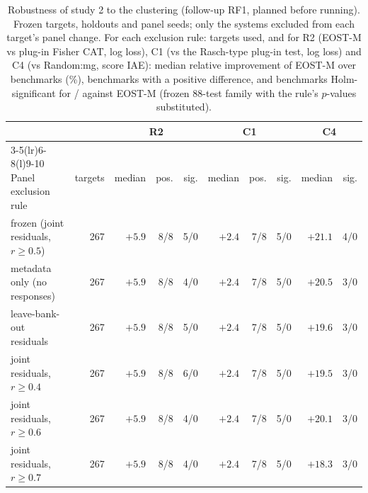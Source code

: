 \begin{table}[tbp]
\centering\footnotesize
\caption{Robustness of study 2 to the clustering (follow-up RF1, planned before running). Frozen targets, holdouts and panel seeds; only the systems excluded from each target's panel change. For each exclusion rule: targets used, and for R2 (EOST-M vs plug-in Fisher CAT, log loss), C1 (vs the Rasch-type plug-in test, log loss) and C4 (vs Random:mg, score IAE): median relative improvement of EOST-M over benchmarks (\%), benchmarks with a positive difference, and benchmarks Holm-significant for / against EOST-M (frozen 88-test family with the rule's $p$-values substituted).}
\label{tab:robclust}
\setlength{\tabcolsep}{2.5pt}
\begin{tabular}{@{}lrrrrrrrrr@{}}
\toprule
 & & \multicolumn{3}{c}{R2} & \multicolumn{3}{c}{C1} & \multicolumn{2}{c}{C4} \\
\cmidrule(lr){3-5}\cmidrule(lr){6-8}\cmidrule(l){9-10}
Panel exclusion rule & targets & median & pos. & sig. & median & pos. & sig. & median & sig. \\
\midrule
frozen (joint residuals, $r\ge0.5$) & 267 & $+5.9$ & 8/8 & 5/0 & $+2.4$ & 7/8 & 5/0 & $+21.1$ & 4/0 \\
\midrule
metadata only (no responses) & 267 & $+5.9$ & 8/8 & 4/0 & $+2.4$ & 7/8 & 5/0 & $+20.5$ & 3/0 \\
leave-bank-out residuals & 267 & $+5.9$ & 8/8 & 5/0 & $+2.4$ & 7/8 & 5/0 & $+19.6$ & 3/0 \\
joint residuals, $r\ge0.4$ & 267 & $+5.9$ & 8/8 & 6/0 & $+2.4$ & 7/8 & 5/0 & $+19.5$ & 3/0 \\
joint residuals, $r\ge0.6$ & 267 & $+5.9$ & 8/8 & 4/0 & $+2.4$ & 7/8 & 5/0 & $+20.1$ & 3/0 \\
joint residuals, $r\ge0.7$ & 267 & $+5.9$ & 8/8 & 4/0 & $+2.4$ & 7/8 & 5/0 & $+18.3$ & 3/0 \\
\bottomrule
\end{tabular}
\end{table}
